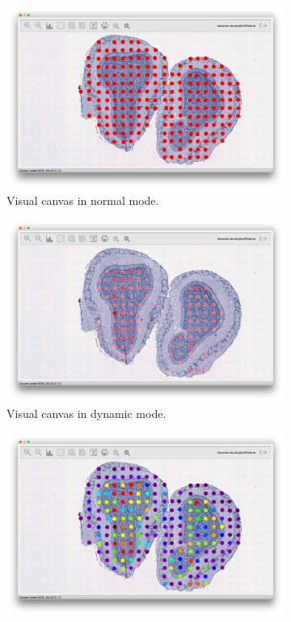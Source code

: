 \documentclass[10pt,a4paper,titlepage]{book}
\begin{document}
\begin{figure}[h]
	\centering
	\begin{subfigure}{0.3\linewidth}
		\includegraphics[width=\linewidth]{./Pictures/vc_normal}
		\caption{Visual canvas in normal mode.}
		\label{fig:vc_normal}
	\end{subfigure}
	\begin{subfigure}{0.3\linewidth}
		\includegraphics[width=\linewidth]{./Pictures/vc_dynamic}
		\caption{Visual canvas in dynamic mode.}
		\label{fig:vc_dynamic}
	\end{subfigure}
	\begin{subfigure}{0.3\linewidth}
		\includegraphics[width=\linewidth]{./Pictures/vc_heatmap}

\end{subfigure}
\end{figure}
\end{document}
